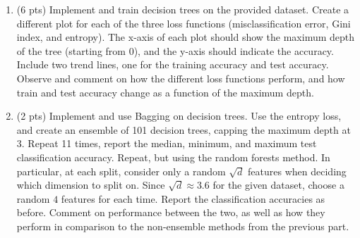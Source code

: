 \documentclass[10pt,letter,notitlepage]{article}
\newcounter{exercise}
\begin{document}
\begin{exercise}
  \begin{enumerate} [label=\alph*)]
    \item (6 pts) Implement and train decision trees on the provided dataset. Create a different plot for each of the three loss functions (misclassification error, Gini index, and entropy). The x-axis of each plot should show the maximum depth of the tree (starting from 0), and the y-axis should indicate the accuracy. Include two trend lines, one for the training accuracy and test accuracy. Observe and comment on how the different loss functions perform, and how train and test accuracy change as a function of the maximum depth.
    \item (2 pts) Implement and use Bagging on decision trees. Use the entropy loss, and create an ensemble of 101 decision trees, capping the maximum depth at 3. Repeat 11 times, report the median, minimum, and maximum test classification accuracy.
      Repeat, but using the random forests method. In particular, at each split, consider only a random $\sqrt{d}$ features when deciding which dimension to split on. Since $\sqrt{d} \approx 3.6$ for the given dataset, choose a random $4$ features for each time.
      Report the classification accuracies as before.
      Comment on performance between the two, as well as how they perform in comparison to the non-ensemble methods from the previous part.
  \end{enumerate} 
\end{exercise} 
\end{document}
